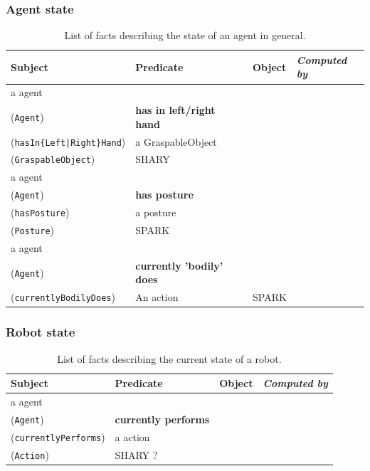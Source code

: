 \documentclass{svmult}
\newcommand{\concept}[1]{{\footnotesize \texttt{#1}}}
\begin{document}
\subsubsection{Agent state}

\begin{table}[h]
	\centering
	\begin{tabular}{p{3cm}p{6cm}p{3cm}l}
		\textbf{Subject} & \textbf{Predicate} & \textbf{Object} & \emph{Computed by} \\
		\hline


 a agent
\\ (\concept{Agent})  & 

\textbf{has in left/right hand}
\\ (\concept{hasIn\{Left|Right\}Hand})  & 

 a GraspableObject
\\ (\concept{GraspableObject})  & 

 SHARY \\ 


 a agent
\\ (\concept{Agent})  & 

\textbf{has posture}
\\ (\concept{hasPosture})  & 

 a posture
\\ (\concept{Posture})  & 

 SPARK  \\ 


 a agent
\\ (\concept{Agent})  & 

\textbf{currently 'bodily' does}
\\ (\concept{currentlyBodilyDoes})  & 

 An action  & 

 SPARK
 
	\end{tabular}
	\caption{List of facts describing the state of an agent in general.}
\end{table}



\subsubsection{Robot state}

\begin{table}[h]
	\centering
	\begin{tabular}{p{3cm}p{6cm}p{3cm}l}
		\textbf{Subject} & \textbf{Predicate} & \textbf{Object} & \emph{Computed by} \\
		\hline


 a agent
\\ (\concept{Agent})  & 

\textbf{currently performs}
\\ (\concept{currentlyPerforms})  & 

 a action
\\ (\concept{Action})  & 

 SHARY ?

	\end{tabular}
	\caption{List of facts describing the current state of a robot.}
\end{table}
\end{document}
